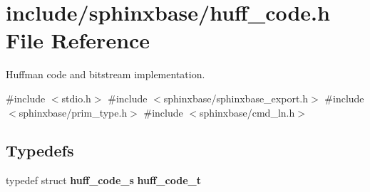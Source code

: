 \section{include/sphinxbase/huff\-\_\-code.h \-File \-Reference}
\label{huff__code_8h}


\-Huffman code and bitstream implementation.  


{\ttfamily \#include $<$stdio.\-h$>$}\*
{\ttfamily \#include $<$sphinxbase/sphinxbase\-\_\-export.\-h$>$}\*
{\ttfamily \#include $<$sphinxbase/prim\-\_\-type.\-h$>$}\*
{\ttfamily \#include $<$sphinxbase/cmd\-\_\-ln.\-h$>$}\*
\subsection*{\-Typedefs}
\begin{DoxyCompactItemize}
\item 
typedef struct {\bf huff\-\_\-code\-\_\-s} {\bfseries huff\-\_\-code\-\_\-t}\label{huff__code_8h_a99a5188e6a18682c96100cd5232af0f4}

\end{DoxyCompactItemize}
